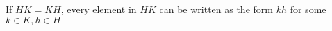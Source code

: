 \documentclass[12pt]{article}
\begin{document}
\subsection{}
\subsection{}
\subsection{}

\section{}
\subsection{}
\subsection{}
\subsection{}
If $HK=KH$, every element in $HK$ can be written as the form $kh$ for some $k\in K,h\in H$
\subsection{}

\section{}
\end{document}
